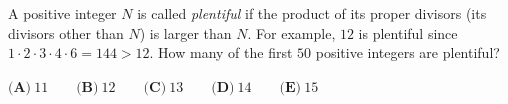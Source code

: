 A positive integer $N$ is called \emph{plentiful} if the product of its proper divisors (its divisors other than $N$) is larger than $N$. For example, $12$ is plentiful since $1\cdot2\cdot3\cdot4\cdot6=144>12$. How many of the first $50$ positive integers are plentiful?

$\textbf{(A)}\ 11\qquad\textbf{(B)}\ 12\qquad\textbf{(C)}\ 13\qquad\textbf{(D)}\ 14\qquad\textbf{(E)}\ 15$
